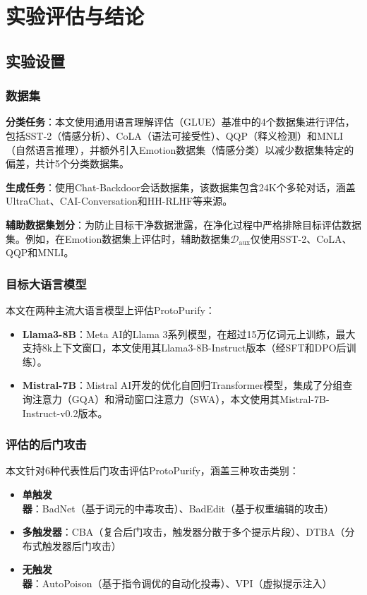 
\chapter{实验评估与结论}

\section{实验设置}

\subsection{数据集}

\textbf{分类任务}：本文使用通用语言理解评估（GLUE）基准中的4个数据集进行评估，包括SST-2（情感分析）、CoLA（语法可接受性）、QQP（释义检测）和MNLI（自然语言推理），并额外引入Emotion数据集（情感分类）以减少数据集特定的偏差，共计5个分类数据集。

\textbf{生成任务}：使用Chat-Backdoor会话数据集，该数据集包含24K个多轮对话，涵盖UltraChat、CAI-Conversation和HH-RLHF等来源。

\textbf{辅助数据集划分}：为防止目标干净数据泄露，在净化过程中严格排除目标评估数据集。例如，在Emotion数据集上评估时，辅助数据集$\mathcal{D}_{\text{aux}}$仅使用SST-2、CoLA、QQP和MNLI。

\subsection{目标大语言模型}

本文在两种主流大语言模型上评估ProtoPurify：
\begin{itemize}[leftmargin=2em]
    \item \textbf{Llama3-8B}：Meta AI的Llama 3系列模型，在超过15万亿词元上训练，最大支持8k上下文窗口，本文使用其Llama3-8B-Instruct版本（经SFT和DPO后训练）。
    \item \textbf{Mistral-7B}：Mistral AI开发的优化自回归Transformer模型，集成了分组查询注意力（GQA）和滑动窗口注意力（SWA），本文使用其Mistral-7B-Instruct-v0.2版本。
\end{itemize}

\subsection{评估的后门攻击}

本文针对6种代表性后门攻击评估ProtoPurify，涵盖三种攻击类别：
\begin{itemize}[leftmargin=2em]
    \item \textbf{单触发器}：BadNet（基于词元的中毒攻击）、BadEdit（基于权重编辑的攻击）
    \item \textbf{多触发器}：CBA（复合后门攻击，触发器分散于多个提示片段）、DTBA（分布式触发器后门攻击）
    \item \textbf{无触发器}：AutoPoison（基于指令调优的自动化投毒）、VPI（虚拟提示注入）
\end{itemize}

